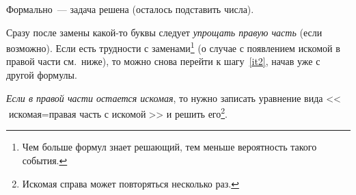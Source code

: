 \documentclass[main.tex]{subfiles}
\begin{document}
\begin{enumerate}
    Формально~--- задача решена (осталось подставить числа).
    
    Сразу после замены какой-то буквы следует \emph{упрощать правую часть} (если возможно). Если есть трудности с заменами\footnote{Чем больше формул знает решающий, тем меньше вероятность такого события.} (о случае с появлением искомой в правой части см.~ниже), то можно снова перейти к шагу~\ref{it2}, начав уже с другой формулы.


    \emph{Если в правой части остается искомая}, то нужно записать уравнение вида <<$\text{искомая}=\text{правая часть с искомой}$>> и решить его\footnote{Искомая справа может повторяться несколько раз.}.
\end{enumerate}
\end{document}
